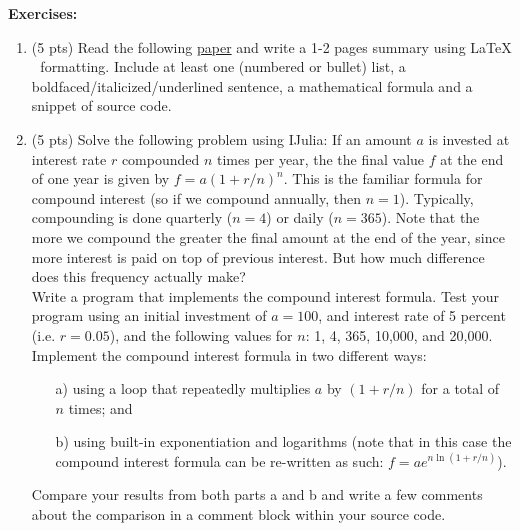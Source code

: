 \documentclass[11pt,a4paper,oneside]{report}
\begin{document}
{\bf Exercises: }
\begin{enumerate}
\item (5 pts) Read the following \href{http://www.ee.columbia.edu/~dpwe/e6891/resources/1210.0530v3.pdf}{paper} and write a 1-2 pages summary using \LaTeX $\;$ formatting. Include at least one (numbered or bullet) list, a boldfaced/italicized/underlined sentence, a mathematical formula and a snippet of source code.

\item (5 pts) Solve the following problem using IJulia: If an amount $a$ is invested at interest rate $r$ compounded $n$ times per year, the the final value $f$ at the end of one year is given by $f = a(1 + r/n)^n$. This is the familiar formula for compound interest (so if we compound annually, then $n=1$). Typically, compounding is done quarterly ($n=4$) or daily ($n=365$). Note that the more we compound the greater the final amount at the end of the year, since more interest is paid on top of previous interest. But how much difference does this frequency actually make? \\

Write a program that implements the compound interest formula. Test your program using an initial investment of $a=100$, and interest rate of 5 percent (i.e. $r=0.05$), and the following values for $n$: 1, 4, 365, 10,000, and 20,000. Implement the compound interest formula in two different ways:
\begin{enumerate}
\item[a) ] using a loop that repeatedly multiplies $a$ by $(1+r/n)$ for a total of $n$ times; and
\item[b) ] using built-in exponentiation and logarithms (note that in this case the compound interest formula can be re-written as such: $f = ae^{n\ln(1+r/n)}$).
\end{enumerate}
Compare your results from both parts a and b and write a few comments about the comparison in a comment block within your source code.


\end{enumerate}
\end{document}
